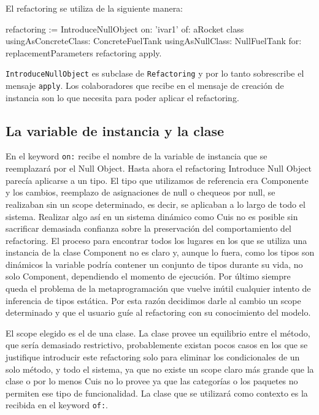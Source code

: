 El refactoring se utiliza de la siguiente manera:

\begin{code}
refactoring := IntroduceNullObject
    on: 'ivar1'
    of: aRocket class
    usingAsConcreteClass: ConcreteFuelTank
    usingAsNullClass: NullFuelTank
    for: replacementParameters
refactoring apply.
\end{code}

\lstinline{IntroduceNullObject} es subclase de \lstinline{Refactoring} y por lo tanto sobrescribe el
mensaje \lstinline{apply}. Los colaboradores que recibe en el mensaje de creación de instancia son 
lo que necesita para poder aplicar el refactoring.

\subsection*{La variable de instancia y la clase}
En el keyword \lstinline{on:} recibe el nombre de la variable de instancia que se reemplazará por el
Null Object. Hasta ahora el refactoring Introduce Null Object parecía aplicarse a un tipo. El tipo
que utilizamos de referencia era Componente y los cambios, reemplazo de asignaciones de null o 
chequeos por null, se realizaban sin un scope determinado, es decir, se aplicaban a lo largo de todo
el sistema. Realizar algo así en un sistema dinámico como Cuis no es posible sin sacrificar
demasiada confianza sobre la preservación del comportamiento del refactoring. El proceso para encontrar
todos los lugares en los que se utiliza una instancia de la clase Component no es claro y, aunque lo
fuera, como los tipos son dinámicos la variable podría contener un conjunto de tipos durante su
vida, no solo Component, dependiendo el momento de ejecución. Por último siempre queda el problema de
la metaprogramación que vuelve inútil cualquier intento de inferencia de tipos estática. Por esta
razón decidimos darle al cambio un scope determinado y que el usuario guíe al refactoring con su
conocimiento del modelo.

El scope elegido es el de una clase. La clase provee un equilibrio entre el método, que sería
demasiado restrictivo, probablemente existan pocos casos en los que se justifique introducir este
refactoring solo para eliminar los condicionales de un solo método, y todo el sistema, ya que no
existe un scope claro más grande que la clase o por lo menos Cuis no lo provee ya que las categorías
o los paquetes no permiten ese tipo de funcionalidad. La clase que se utilizará como contexto es la 
recibida en el keyword \lstinline{of:}.


